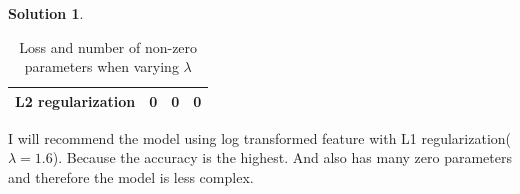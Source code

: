 \documentclass[]{book}
\theoremstyle{definition}
\newtheorem*{soln}{Solution}
\begin{document}
\begin{enumerate}
\begin{soln}
\begin{table}[H]
\begin{tabular}{cccc}
				L2 regularization & 0 & 0 & 0 \\ 
				\hline 
			\end{tabular} 
			\caption{Loss and number of non-zero parameters when varying $\lambda$}
			\label{tab:sparsity}
		\end{table}
		
		\noindent
		I will recommend the model using log transformed feature with L1 regularization($\lambda = 1.6$). Because the accuracy is the highest. And also has many zero parameters and therefore the model is less complex. 
	\end{soln}
	
\end{enumerate}
\end{document}
